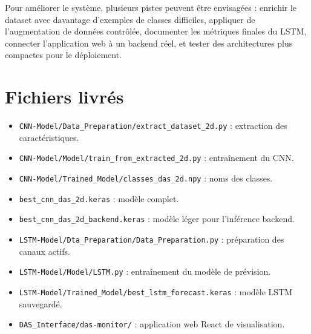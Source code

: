 \documentclass[10pt,a4paper]{article}
\begin{document}
Pour améliorer le système, plusieurs pistes peuvent être envisagées : enrichir le dataset avec davantage
d'exemples de classes difficiles, appliquer de l'augmentation de données contrôlée, documenter les métriques
finales du LSTM, connecter l'application web à un backend réel, et tester des architectures plus compactes
pour le déploiement.

\section*{Fichiers livrés}

\begin{itemize}
    \item \texttt{CNN-Model/Data\_Preparation/extract\_dataset\_2d.py} : extraction des caractéristiques.
    \item \texttt{CNN-Model/Model/train\_from\_extracted\_2d.py} : entraînement du CNN.
    \item \texttt{CNN-Model/Trained\_Model/classes\_das\_2d.npy} : noms des classes.
    \item \texttt{best\_cnn\_das\_2d.keras} : modèle complet.
    \item \texttt{best\_cnn\_das\_2d\_backend.keras} : modèle léger pour l'inférence backend.
    \item \texttt{LSTM-Model/Dta\_Preparation/Data\_Preparation.py} : préparation des canaux actifs.
    \item \texttt{LSTM-Model/Model/LSTM.py} : entraînement du modèle de prévision.
    \item \texttt{LSTM-Model/Trained\_Model/best\_lstm\_forecast.keras} : modèle LSTM sauvegardé.
    \item \texttt{DAS\_Interface/das-monitor/} : application web React de visualisation.
\end{itemize}
\end{document}
